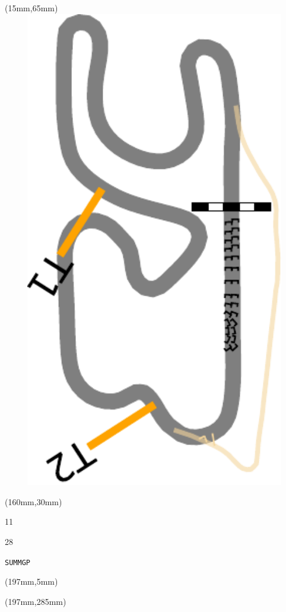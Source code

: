 \begin{textblock*}{185mm}(15mm,65mm)%
\centering
\mbox{\includegraphics[width=185mm,height=210mm,keepaspectratio]{PT/SUMMGP.pdf}}
\end{textblock*}
\begin{textblock*}{40mm}(160mm,30mm)%
\Large
\par{} 
\par11 
\par28 
\par\hfill\tiny\tt SUMMGP\\
\end{textblock*}
\begin{textblock*}{20mm}(197mm,5mm)%
\fbox{\thepage}
\label{SUMMGP}
\end{textblock*}
\begin{textblock*}{20mm}(197mm,285mm)%
\fbox{\thepage}
\end{textblock*}

